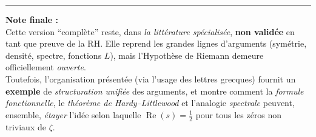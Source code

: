 \documentclass[11pt]{article}
\begin{document}
\vspace{12pt}
\hrule
\vspace{6pt}

\noindent
\textbf{Note finale :}\\
Cette version “complète” reste, dans \emph{la littérature spécialisée}, \textbf{non validée} en tant que preuve de la RH. Elle reprend les grandes lignes d'arguments (symétrie, densité, spectre, fonctions $L$), mais l'Hypothèse de Riemann demeure officiellement \emph{ouverte}.\\[6pt]
Toutefois, l'organisation présentée (via l'usage des lettres grecques) fournit un \textbf{exemple} de \emph{structuration unifiée} des arguments, et montre comment la \emph{formule fonctionnelle}, le \emph{théorème de Hardy--Littlewood} et l'analogie \emph{spectrale} peuvent, ensemble, \emph{étayer} l'idée selon laquelle \(\operatorname{Re}(s)=\tfrac12\) pour tous les zéros non triviaux de \(\zeta\).
\end{document}
